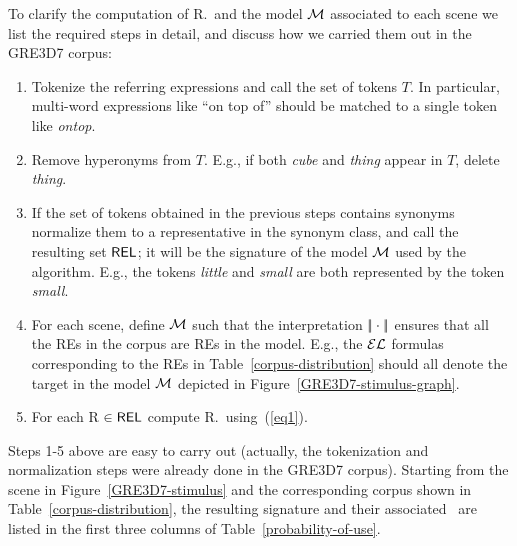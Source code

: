 To clarify the computation of R.\puse\ and the model $\mathcal{M}$ associated to each scene we list the required steps in detail, 
and discuss how we carried them out in the GRE3D7 corpus:

\vspace*{-.4cm}
\begin{enumerate}
\item Tokenize the referring expressions and call the set of tokens $T$. In particular, multi-word expressions like ``on top of'' 
should be matched to a single token like \emph{ontop}.\\[-1.9em]

\item Remove hyperonyms from $T$. E.g., if both \emph{cube} and \emph{thing} appear in $T$, delete \emph{thing}.\\[-2em]

\item If the set of tokens obtained in the previous steps contains synonyms normalize them to a representative in the synonym class, 
and call the resulting set $\textsf{REL}$; it will be the signature of the model $\mathcal{M}$ used by the algorithm. E.g., the tokens \emph{little} 
and \emph{small} are both represented by the token \emph{small}.\\[-1.9em]

\item For each scene, define $\mathcal{M}$ such that the interpretation $|\!|\cdot|\!|$ ensures that all the REs in the corpus are REs in the model.
 E.g., the $\mathcal{EL}$ formulas corresponding to the REs in Table~\ref{corpus-distribution} should all denote the target in the model $\mathcal{M}$ 
depicted in 
Figure~\ref{GRE3D7-stimulus-graph}.\\[-1.9em]

\item For each R $\in \textsf{REL}$ compute R.\puse\ using~(\ref{eq1}).\\[-1.9em]

\end{enumerate}

Steps 1-5 above are easy to carry out (actually, the tokenization and normalization steps were already done in the GRE3D7 corpus). 
Starting from the scene in Figure~\ref{GRE3D7-stimulus} and the corresponding corpus shown in Table~\ref{corpus-distribution}, 
the resulting signature and their associated \puse\ are listed in the first three columns of Table~\ref{probability-of-use}. 

